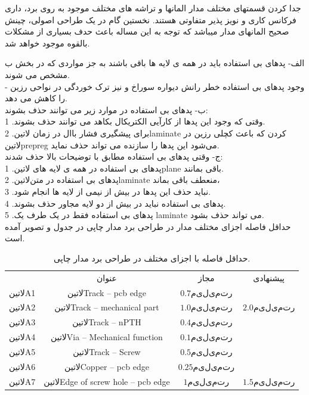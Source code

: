 جدا کردن قسمتهای مختلف مدار
المانها و تراشه های مختلف موجود به روی برد، داری فرکانس کاری و نویز پذیر متفاوتی هستند. نخستین گام در یک طراحی اصولی، چینش صحیح المانهای مدار میباشد که توجه به این مساله باعث حدف بسیاری از مشکلات بالقوه موجود خواهد شد.




الف- پدهای بی استفاده باید در همه ی لایه ها باقی باشند به جز مواردی که در بخش ب مشخص
می شوند.\\
- وجود پدهای بی استفاده خطر رانش دیواره سوراخ و نیز ترک خوردگی در نواحی رزین
را کاهش می دهد.\\
ب- پدهای بی استفاده در موارد زیر می توانند حذف بشوند:\\
1 .وقتی که وجود این پدها از کارآیی الکتریکال بکاهد می توانند حذف بشوند.\\
2 .برای پیشگیری فشار باال در زمان ‌لاتین{laminate} کردن که باعث کچلی رزین در ‌لاتین{prepreg} می‌شود این پدها را سازنده می تواند حذف نماید.\\
ج- وقتی پدهای بی استفاده مطابق با توضیحات بالا حذف شدند:\\
1 .پدهای بی استفاده در همه ی لایه های ‌لاتین{plane} باقی بمانند.\\
2 .پدهای بی استفاده در متن‌لاتین{laminate} منعطف باقی بماند،\\
3 .نباید حذف این پدها در بیش از نیمی از لایه ها انجام شود.\\
4 .پدهای بی استفاده نباید در بیش از دو لایه مجاور حذف بشوند.\\
5 .پدهای بی استفاده فقط در یک طرف یک laminate می تواند حذف بشود.\\

حداقل فاصله اجزای مختلف مدار در طراحی برد مدار چاپی در جدول  و تصویر  آمده است.
\begin{table}[!h]
	\centering
	\caption{حداقل فاصله با اجزای مختلف در طراحی برد مدار چاپی.}
	\label{table:pcbdistance}
	\begin{tabular}{cccc}
		& عنوان & مجاز & پیشنهادی   \\
	‌لاتین{A1}	&  ‌لاتین{Track – pcb edge}     &  $0.7 میلی‌متر$     &            \\
	‌لاتین{A2}	&    ‌لاتین{Track – mechanical part}   & $1.0 میلی‌متر $     &            $2.0 میلی‌متر$\\
	‌لاتین{A3}	&  ‌لاتین{Track – nPTH}     &   $0.4 میلی‌متر $   &            \\
	‌لاتین{A4}	&  ‌لاتین{Via – Mechanical function}     &   $0.1 میلی‌متر $   &            \\
	‌لاتین{A5}	&  ‌لاتین{Track – Screw }     &   $0.5 میلی‌متر $   &            \\
	‌لاتین{A6}	&  ‌لاتین{Copper – pcb edge}     &   $0.25 میلی‌متر $   &            \\
	‌لاتین{A7}	&  ‌لاتین{Edge of screw hole – pcb edge}     &   $1 میلی‌متر $   &            $1.5 میلی‌متر$\\
	\end{tabular}
\end{table}

